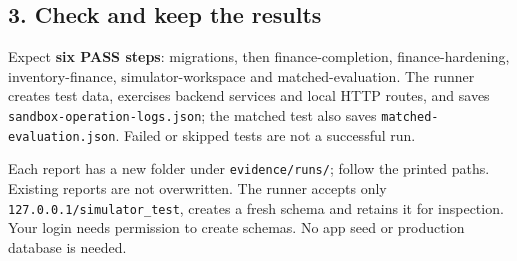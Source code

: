 \documentclass[10pt,a4paper]{article}
\begin{document}
\subsection*{3. Check and keep the results}
Expect \textbf{six PASS steps}: migrations, then finance-completion, finance-hardening, inventory-finance, simulator-workspace and matched-evaluation. The runner creates test data, exercises backend services and local HTTP routes, and saves \texttt{sandbox-operation-logs.json}; the matched test also saves \texttt{matched-evaluation.json}. Failed or skipped tests are not a successful run.

Each report has a new folder under \texttt{evidence/runs/}; follow the printed paths. Existing reports are not overwritten. The runner accepts only \texttt{127.0.0.1/simulator\_test}, creates a fresh schema and retains it for inspection. Your login needs permission to create schemas. No app seed or production database is needed.

\end{document}
